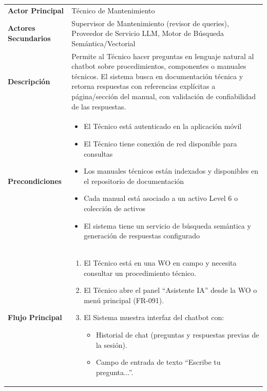 \begin{longtable}{>{\raggedright\arraybackslash}p{0.21\textwidth} >{\raggedright\arraybackslash}p{0.74\textwidth}} \toprule
\textbf{Actor Principal} & Técnico de Mantenimiento \\
\textbf{Actores Secundarios} & Supervisor de Mantenimiento (revisor de queries), Proveedor de Servicio LLM, Motor de Búsqueda Semántica/Vectorial \\
\textbf{Descripción} & Permite al Técnico hacer preguntas en lenguaje natural al chatbot sobre procedimientos, componentes o manuales técnicos. El sistema busca en documentación técnica y retorna respuestas con referencias explícitas a página/sección del manual, con validación de confiabilidad de las respuestas. \\
\textbf{Precondiciones} & \parbox[t]{\linewidth}{\vspace{2pt} \begin{itemize}[leftmargin=1.5em, nosep, topsep=0pt]
\item El Técnico está autenticado en la aplicación móvil
\item El Técnico tiene conexión de red disponible para consultas
\item Los manuales técnicos están indexados y disponibles en el repositorio de documentación
\item Cada manual está asociado a un activo Level 6 o colección de activos
\item El sistema tiene un servicio de búsqueda semántica y generación de respuestas configurado
\end{itemize} \vspace{2pt}} \\
\textbf{Flujo Principal} & \parbox[t]{\linewidth}{\vspace{2pt} \begin{enumerate}[leftmargin=1.5em, nosep, topsep=0pt]
\item El Técnico está en una WO en campo y necesita consultar un procedimiento técnico.
\item El Técnico abre el panel ``Asistente IA'' desde la WO o menú principal (FR-091).
\item El Sistema muestra interfaz del chatbot con:
\begin{itemize}[leftmargin=1.2em, nosep, topsep=0pt]
\item Historial de chat (preguntas y respuestas previas de la sesión).
\item Campo de entrada de texto ``Escribe tu pregunta...''.

\end{itemize}
\end{enumerate}}
\end{longtable}
